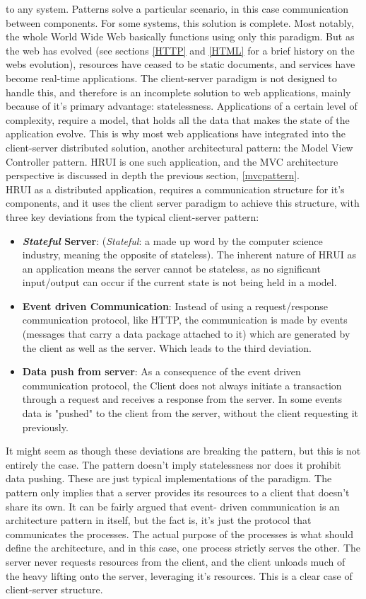 to any system. Patterns solve a particular scenario, in this case communication between components. For some systems, this 
solution is complete. Most notably, the whole World Wide Web basically functions using only this paradigm. But as the web has 
evolved (see sections \ref{HTTP} and \ref{HTML} for a brief history on the webs evolution), resources have ceased to be static 
documents, and services have become real-time applications. The client-server paradigm is not designed to handle this, and 
therefore is an incomplete solution to web applications, mainly because of it's primary advantage: statelessness. Applications 
of a certain level of complexity, require a model, that holds all the data that makes the state of the application evolve. 
This is why most web applications have integrated into the client-server distributed solution, another architectural pattern: 
the Model View Controller pattern. HRUI is one such application, and the MVC architecture perspective is discussed in depth 
the previous section, \ref{mvcpattern}.\\

HRUI as a distributed application, requires a communication structure for it's components, and it uses the client server 
paradigm to achieve this structure, with three key deviations from the typical client-server pattern:
\begin{itemize}
	\item \textbf{\textit{Stateful} Server}: (\textit{Stateful}: a made up word by the computer science industry, meaning the 
	opposite of stateless). The inherent nature of HRUI as an application means the server cannot be stateless, as no 
	significant input/output can occur if the current state is not being held in a model.
	\item \textbf{Event driven Communication}: Instead of using a request/response communication protocol, like HTTP, the 
	communication is made by events (messages that carry a data package attached to it) which are generated by the client as 
	well as the server. Which leads to the third deviation.
	\item \textbf{Data push from server}: As a consequence of the event driven communication protocol, the Client does not 
	always initiate a transaction through a request and receives a response from the server. In some events data is "pushed" 
	to the client from the server, without the client requesting it previously.
\end{itemize}
It might seem as though these deviations are breaking the pattern, but this is not entirely the case. The pattern doesn't 
imply statelessness nor does it prohibit data pushing. These are just typical implementations of the paradigm. The pattern 
only implies that a server provides its resources to a client that doesn't share its own. It can be fairly argued that event-
driven communication is an architecture pattern in itself, but the fact is, it's just the protocol that communicates the 
processes. The actual purpose of the processes is what should define the architecture, and in this case, one process strictly 
serves the other. The server never requests resources from the client, and the client unloads much of the heavy lifting onto 
the server, leveraging it's resources. This is a clear case of client-server structure.
